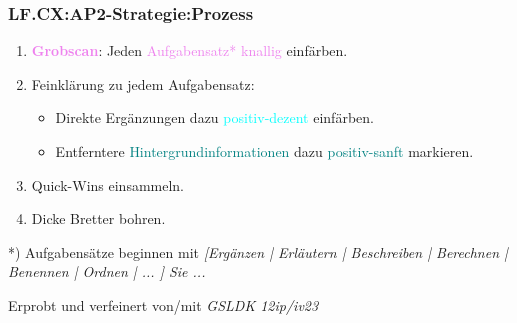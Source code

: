\begin{frame}  
  \frametitle{LF.CX:AP2-Strategie:Prozess}

  \vspace{0.5cm}
  \begin{enumerate}
    \item \textbf{\textcolor{violet}{Grobscan}}: Jeden \textcolor{violet}{Aufgabensatz* knallig} einfärben.
    \item Feinklärung zu jedem Aufgabensatz:
    \begin{itemize}
      \item {Direkte Ergänzungen} dazu \textcolor{cyan}{positiv-dezent} einfärben.
      \item Entferntere \textcolor{teal}{Hintergrundinformationen} dazu \textcolor{teal}{positiv-sanft} markieren.
    \end{itemize}
    
    \item Quick-Wins einsammeln.
    \item Dicke Bretter bohren.
  \end{enumerate}

  
  \vspace{0.5cm}
  \begin{tiny}
  \begin{flushright}
    *) Aufgabensätze beginnen mit \textit{[Ergänzen | Erläutern | Beschreiben | Berechnen | Benennen | Ordnen | ... ] Sie ... }
  \end{flushright}
  \end{tiny}

  \vspace{2cm}
  \begin{tiny}
  \begin{flushright}
    Erprobt und verfeinert von/mit \textit{GSLDK 12ip/iv23}
  \end{flushright}
  \end{tiny}
\end{frame}

